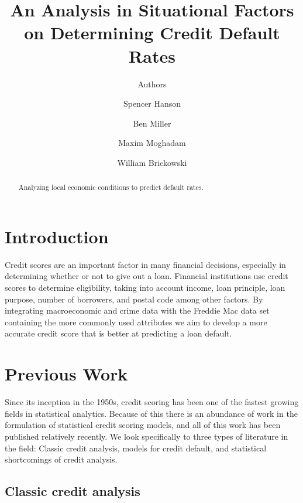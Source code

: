 \documentclass[sigconf, 11pt]{acmart}
\begin{document}
\title{An Analysis in Situational Factors on Determining Credit Default Rates}
\subtitle{Authors}

\author{Spencer Hanson}
\affiliation{}

\author{Ben Miller}
\affiliation{}

\author{Maxim Moghadam}
\affiliation{}

\author{William Brickowski}
\affiliation{}

\begin{abstract}
Analyzing local economic conditions to predict default rates.
\end{abstract}

\maketitle



\section{Introduction}
Credit scores are an important factor in many financial decisions, especially in determining whether or not to give out a loan. Financial institutions use credit scores to determine eligibility, taking into account income, loan principle, loan purpose, number of borrowers, and postal code among other factors. By integrating macroeconomic and crime data with the Freddie Mac data set containing the more commonly used attributes we aim to develop a more accurate credit score that is better at predicting a loan default.

\section{Previous Work}
Since its inception in the 1950s, credit scoring has been one of the fastest growing fields in statistical analytics. Because of this there is an abundance of work in the formulation of statistical credit scoring models, and all of this work has been published relatively recently. We look specifically to three types of literature in the field: Classic credit analysis, models for credit default, and statistical shortcomings of credit analysis.

\subsection{Classic credit analysis}
\end{document}
